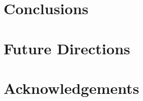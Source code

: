 \documentclass[isoft]{poster_class_UofC}
\begin{document}
\begin{poster}
            
            
    
        \section{Conclusions}
    
            \lipsum[15]
        \section{Future Directions}

    
        \section{Acknowledgements}

        
        
    
    
    \end{poster}
\end{document}
